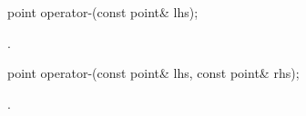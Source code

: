 %
%
\begin{itemdecl}
point operator-(const point& lhs);
\end{itemdecl}
\begin{itemdescr}
	\pnum
	\returns
	.
\end{itemdescr}

%
%
\begin{itemdecl}
point operator-(const point& lhs, const point& rhs);
\end{itemdecl}
\begin{itemdescr}
	\pnum
	\returns
	.
\end{itemdescr}
